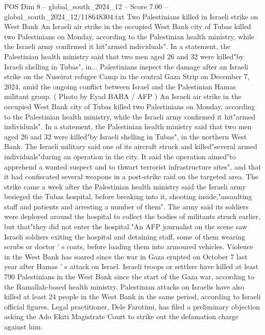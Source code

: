 \begin{textsample}{POS Dim 8 – global\_south\_2024\_12 – Score 7.00 – global\_south\_2024\_12/118648304.txt}  \label{ex:f8_pos_352}
Two Palestinians killed in Israeli strike on West Bank An Israeli air strike in the occupied West Bank city of Tubas killed two Palestinians on Monday, according to the Palestinian health ministry, while the Israeli army confirmed it hit"armed individuals".
In a statement, the Palestinian health ministry said that two men aged 26 and 32 were killed"by Israeli shelling in Tubas", in...
Palestinians inspect the damage after an Israeli strike on the Nuseirat refugee Camp in the central Gaza Strip on December 7, 2024, amid the ongoing conflict between Israel and the Palestinian Hamas militant group. ( Photo by Eyad BABA / AFP ) An Israeli air strike in the occupied West Bank city of Tubas killed two Palestinians on Monday, according to the Palestinian health ministry, while the Israeli army confirmed it hit"armed individuals".
In a statement, the Palestinian health ministry said that two men aged 26 and 32 were killed"by Israeli shelling in Tubas", in the northern West Bank.
The Israeli military said one of its aircraft struck and killed"several armed individuals"during an operation in the city.
It said the operation aimed"to apprehend a wanted suspect and to thwart terrorist infrastructure sites", and that it had confiscated several weapons in a post-strike raid on the targeted area.
The strike came a week after the Palestinian health ministry said the Israeli army besieged the Tubas hospital, before breaking into it, shooting inside,"assaulting staff and patients and arresting a number of them".
The army said its soldiers were deployed around the hospital to collect the bodies of militants struck earlier, but that"they did not enter the hospital."An AFP journalist on the scene saw Israeli soldiers exiting the hospital and detaining staff, some of them wearing scrubs or doctor ' s coats, before loading them into armoured vehicles.
Violence in the West Bank has soared since the war in Gaza erupted on October 7 last year after Hamas ' s attack on Israel.
Israeli troops or settlers have killed at least 790 Palestinians in the West Bank since the start of the Gaza war, according to the Ramallah-based health ministry.
Palestinian attacks on Israelis have also killed at least 24 people in the West Bank in the same period, according to Israeli official figures.
Legal practitioner, Dele Farotimi, has filed a preliminary objection asking the Ado Ekiti Magistrate Court to strike out the defamation charge against him.

\end{textsample}
